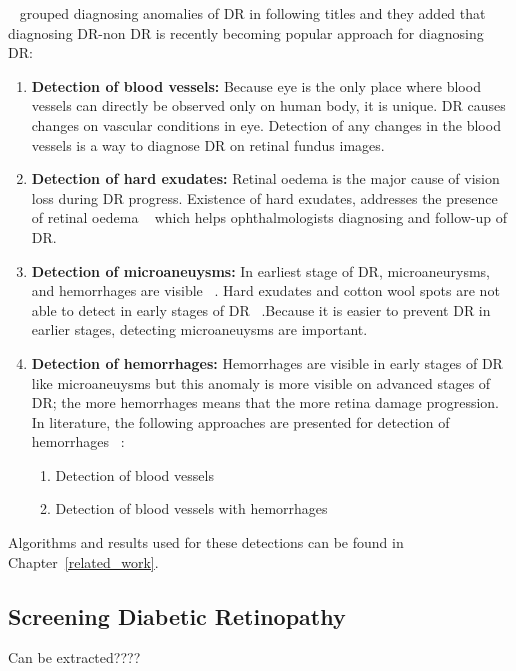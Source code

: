 ~\cite{rocha2011points} grouped diagnosing anomalies of DR in following titles and they added that diagnosing DR-non DR is recently becoming popular approach for diagnosing DR:  
\begin{enumerate}
    \item \textbf{Detection of blood vessels:}  Because eye is the only place where blood vessels can directly be observed only on human body, it is unique. DR causes changes on vascular conditions in eye. Detection of any changes in the blood vessels is a way to diagnose DR on retinal fundus images. ~\cite{mendonca2006segmentation}
    \item \textbf{Detection of hard exudates:} Retinal oedema is the major cause of vision loss during DR progress. Existence of hard exudates, addresses the presence of retinal oedema ~\cite{singer1992screening} which helps ophthalmologists diagnosing and follow-up of DR. ~\cite{garcia2009neural} 
    \item \textbf{Detection of microaneuysms:} In earliest stage of DR, microaneurysms, and hemorrhages are visible ~\cite{doi:10.1056/NEJMra021678}. Hard exudates and cotton wool spots are not able to detect in early stages of DR ~\cite{navarro2016automatic}.Because it is easier to prevent DR in earlier stages, detecting microaneuysms are important.
    \item \textbf{Detection of hemorrhages:} Hemorrhages are visible in early stages of DR like microaneuysms but this anomaly is more visible on advanced stages of DR; the more hemorrhages means that the more retina damage progression. In literature, the following approaches are presented for detection of hemorrhages ~\cite{rocha2011points}: 
    \begin{enumerate}
        \item Detection of blood vessels
        \item Detection of blood vessels with hemorrhages
    \end{enumerate}
\end{enumerate}

Algorithms and results used for these detections can be found in Chapter~\ref{related_work}.




\subsection{Screening Diabetic Retinopathy}

Can be extracted???? 


